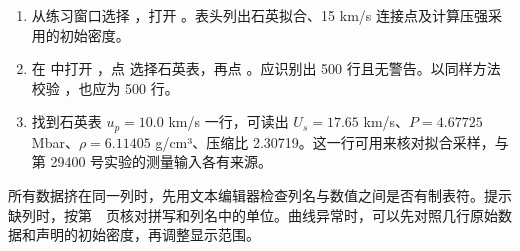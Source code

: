 \begin{enumerate}
\item 从练习窗口选择 ，打开 。表头列出石英拟合、15 km/s 连接点及计算压强采用的初始密度。
\item 在  中打开 ，点  选择石英表，再点 。应识别出 500 行且无警告。以同样方法校验 ，也应为 500 行。
\item 找到石英表 $u_p=10.0$ km/s 一行，可读出 $U_s=17.65$ km/s、$P=4.67725$ Mbar、$\rho=6.11405$ g/cm³、压缩比 2.30719。这一行可用来核对拟合采样，与第 29400 号实验的测量输入各有来源。
\end{enumerate}
所有数据挤在同一列时，先用文本编辑器检查列名与数值之间是否有制表符。提示缺列时，按第~\pageref{materials}~页核对拼写和列名中的单位。曲线异常时，可以先对照几行原始数据和声明的初始密度，再调整显示范围。
